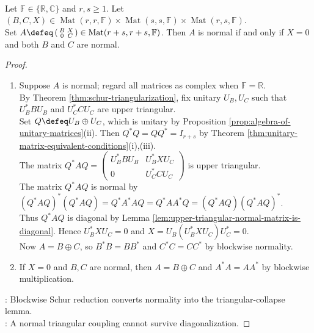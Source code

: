 \begin{proposition} \label{prop:block-upper-triangular-normal-collapse} \\
Let $\mathbb{F}\in\{\mathbb{R},\mathbb{C}\}$ and $r,s\geq1$. Let $(B,C,X)\in\operatorname{Mat}(r,r,\mathbb{F})\times\operatorname{Mat}(s,s,\mathbb{F})\times\operatorname{Mat}(r,s,\mathbb{F})$.\\
Set $A\defeq\left(\begin{smallmatrix}B&X\\0&C\end{smallmatrix}\right)\in\operatorname{Mat}(r+s,r+s,\mathbb{F})$. Then $A$ is normal if and only if $X=0$ and both $B$ and $C$ are normal.
\begin{proof}
\begin{enumerate}[label=\roman*.]
\setlength{\itemsep}{0pt}
\item[$(\Rightarrow)$] Suppose $A$ is normal; regard all matrices as complex when $\mathbb{F}=\mathbb{R}$.\\
By Theorem \ref{thm:schur-triangularization}, fix unitary $U_B,U_C$ such that $U_B^*BU_B$ and $U_C^*CU_C$ are upper triangular.\\
Set $Q\defeq U_B\oplus U_C$, which is unitary by Proposition \ref{prop:algebra-of-unitary-matrices}(ii). Then $Q^*Q=QQ^*=I_{r+s}$ by Theorem \ref{thm:unitary-matrix-equivalent-conditions}(i),(iii).\\
The matrix $Q^*AQ=\left(\begin{smallmatrix}U_B^*BU_B&U_B^*XU_C\\0&U_C^*CU_C\end{smallmatrix}\right)$ is upper triangular.\\
The matrix $Q^*AQ$ is normal by $(Q^*AQ)^*(Q^*AQ)=Q^*A^*AQ=Q^*AA^*Q=(Q^*AQ)(Q^*AQ)^*$.\\
Thus $Q^*AQ$ is diagonal by Lemma \ref{lem:upper-triangular-normal-matrix-is-diagonal}. Hence $U_B^*XU_C=0$ and $X=U_B(U_B^*XU_C)U_C^*=0$.\\
Now $A=B\oplus C$, so $B^*B=BB^*$ and $C^*C=CC^*$ by blockwise normality.
\item[$(\Leftarrow)$] If $X=0$ and $B,C$ are normal, then $A=B\oplus C$ and $A^*A=AA^*$ by blockwise multiplication.
\end{enumerate}
: Blockwise Schur reduction converts normality into the triangular-collapse lemma.\\
: A normal triangular coupling cannot survive diagonalization.
\end{proof}
\end{proposition}

